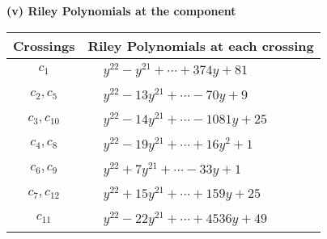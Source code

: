 \documentclass[1p]{elsarticle_modified}
\theoremstyle{definition}
\begin{document}
\newpage\renewcommand{\arraystretch}{1}
\flushleft \textbf{(v) Riley Polynomials at the component}\newline \\
\begin{tabular}{m{50pt}|m{274pt}}
Crossings & \hspace{64pt}Riley Polynomials at each crossing \\
\hline $$\begin{aligned}c_{1}\end{aligned}$$&$\begin{aligned}
&y^{22}- y^{21}+\cdots+374 y+81
\end{aligned}$\\
\hline $$\begin{aligned}c_{2},c_{5}\end{aligned}$$&$\begin{aligned}
&y^{22}-13 y^{21}+\cdots-70 y+9
\end{aligned}$\\
\hline $$\begin{aligned}c_{3},c_{10}\end{aligned}$$&$\begin{aligned}
&y^{22}-14 y^{21}+\cdots-1081 y+25
\end{aligned}$\\
\hline $$\begin{aligned}c_{4},c_{8}\end{aligned}$$&$\begin{aligned}
&y^{22}-19 y^{21}+\cdots+16 y^2+1
\end{aligned}$\\
\hline $$\begin{aligned}c_{6},c_{9}\end{aligned}$$&$\begin{aligned}
&y^{22}+7 y^{21}+\cdots-33 y+1
\end{aligned}$\\
\hline $$\begin{aligned}c_{7},c_{12}\end{aligned}$$&$\begin{aligned}
&y^{22}+15 y^{21}+\cdots+159 y+25
\end{aligned}$\\
\hline $$\begin{aligned}c_{11}\end{aligned}$$&$\begin{aligned}
&y^{22}-22 y^{21}+\cdots+4536 y+49
\end{aligned}$\\
\hline
\end{tabular}\\~\\
\end{document}
